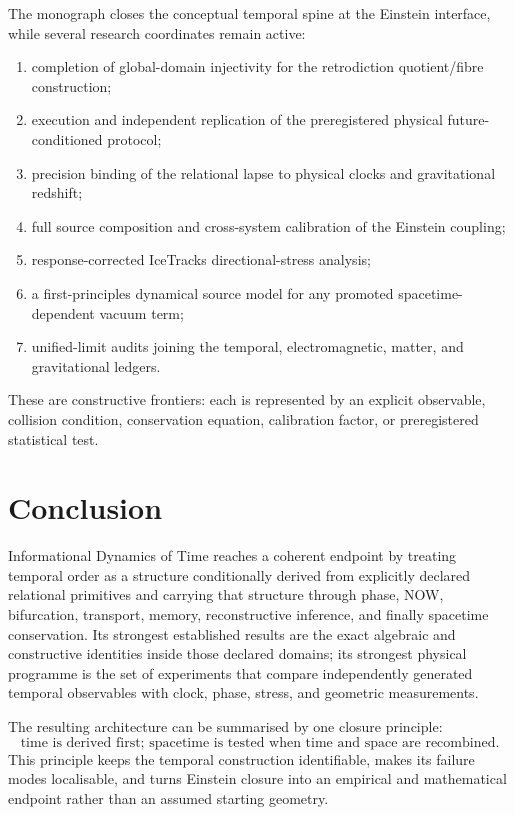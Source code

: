 \documentclass[11pt]{book}
\begin{document}
The monograph closes the conceptual temporal spine at the Einstein interface, while several research coordinates remain active:
\begin{enumerate}
\item completion of global-domain injectivity for the retrodiction quotient/fibre construction;
\item execution and independent replication of the preregistered physical future-conditioned protocol;
\item precision binding of the relational lapse to physical clocks and gravitational redshift;
\item full source composition and cross-system calibration of the Einstein coupling;
\item response-corrected IceTracks directional-stress analysis;
\item a first-principles dynamical source model for any promoted spacetime-dependent vacuum term;
\item unified-limit audits joining the temporal, electromagnetic, matter, and gravitational ledgers.
\end{enumerate}

These are constructive frontiers: each is represented by an explicit observable, collision condition, conservation equation, calibration factor, or preregistered statistical test.

\section{Conclusion}

Informational Dynamics of Time reaches a coherent endpoint by treating temporal order as a structure conditionally derived from explicitly declared relational primitives and carrying that structure through phase, NOW, bifurcation, transport, memory, reconstructive inference, and finally spacetime conservation. Its strongest established results are the exact algebraic and constructive identities inside those declared domains; its strongest physical programme is the set of experiments that compare independently generated temporal observables with clock, phase, stress, and geometric measurements.

The resulting architecture can be summarised by one closure principle:
\[
\boxed{
\text{time is derived first; spacetime is tested when time and space are recombined.}
}
\]
This principle keeps the temporal construction identifiable, makes its failure modes localisable, and turns Einstein closure into an empirical and mathematical endpoint rather than an assumed starting geometry.
\end{document}
